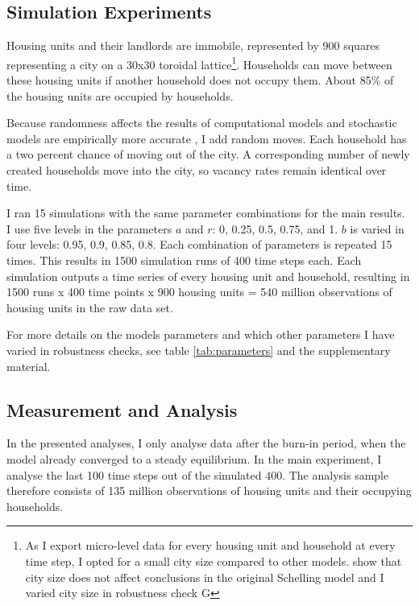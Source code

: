 \subsection{Simulation Experiments}




Housing units and their landlords are immobile, represented by 900 squares representing a city on a 30x30 toroidal lattice\footnote{As I export micro-level data for every housing unit and household at every time step, I opted for a small city size compared to other models. \citep{fossettEffectsCitySize2009} show that city size does not affect conclusions in the original Schelling model and I varied city size in robustness check G}. Households can move between these housing units if another household does not occupy them. About 85\% of the housing units are occupied by households. 

Because randomness affects the results of computational models \citep{macySignalImportanceNoise2015} and stochastic models are empirically more accurate \citep{masRandomDeviationsImprove2020}, I add random moves. Each household has a two percent chance of moving out of the city. A corresponding number of newly created households move into the city, so vacancy rates remain identical over time.

I ran 15 simulations with the same parameter combinations for the main results. I use five levels in the parameters $a$ and $r$: 0, 0.25, 0.5, 0.75, and 1. $b$ is varied in four levels: 0.95, 0.9, 0.85, 0.8. Each combination of parameters is repeated 15 times. This results in 1500 simulation runs of 400 time steps each. Each simulation outputs a time series of every housing unit and household, resulting in 1500 runs x 400 time points x 900 housing units = 540 million observations of housing units in the raw data set.

For more details on the models parameters and which other parameters I have varied in robustness checks, see table \ref{tab:parameters} and the supplementary material.

\subsection{Measurement and Analysis}

In the presented analyses, I only analyse data after the burn-in period, when the model already converged to a steady equilibrium. In the main experiment, I analyse the last 100 time steps out of the simulated 400. The analysis sample therefore consists of 135 million observations of housing units and their occupying households.

